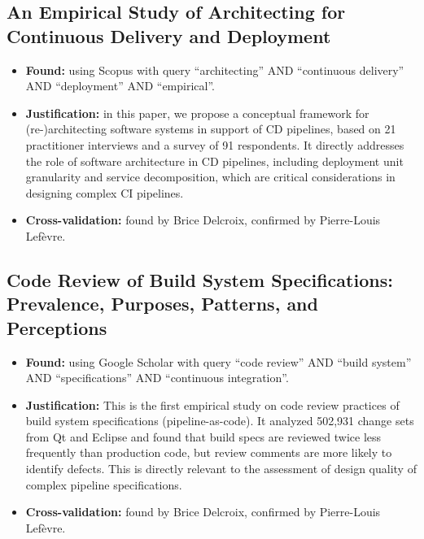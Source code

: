 \documentclass[a4paper,11pt,oneside]{article}
\begin{document}
\subsection{An Empirical Study of Architecting for Continuous Delivery and Deployment \cite{Shahin2019}}
%
\begin{itemize}
    \item \textbf{Found:} using Scopus with query ``architecting'' AND ``continuous delivery'' AND ``deployment'' AND ``empirical''.
    \item \textbf{Justification:} in this paper, we propose a conceptual framework for (re-)architecting software systems in support of CD pipelines, based on 21 practitioner interviews and a survey of 91 respondents. It directly addresses the role of software architecture in CD pipelines, including deployment unit granularity and service decomposition, which are critical considerations in designing complex CI pipelines.
    \item \textbf{Cross-validation:} found by Brice Delcroix, confirmed by Pierre-Louis Lef\`{e}vre.
\end{itemize}

\subsection{Code Review of Build System Specifications: Prevalence, Purposes, Patterns, and Perceptions \cite{Nejati2023}}
%
\begin{itemize}
    \item \textbf{Found:} using Google Scholar with query ``code review'' AND ``build system'' AND ``specifications'' AND ``continuous integration''.
    \item \textbf{Justification:} This is the first empirical study on code review practices of build system specifications (pipeline-as-code). It analyzed 502,931 change sets from Qt and Eclipse and found that build specs are reviewed twice less frequently than production code, but review comments are more likely to identify defects. This is directly relevant to the assessment of design quality of complex pipeline specifications.
    \item \textbf{Cross-validation:} found by Brice Delcroix, confirmed by Pierre-Louis Lef\`{e}vre.
\end{itemize}

\end{document}
